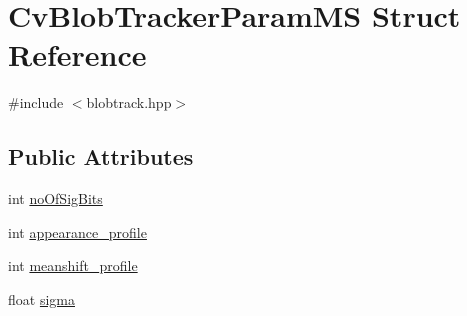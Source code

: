 \hypertarget{structCvBlobTrackerParamMS}{\section{Cv\-Blob\-Tracker\-Param\-M\-S Struct Reference}
\label{structCvBlobTrackerParamMS}
}


{\ttfamily \#include $<$blobtrack.\-hpp$>$}

\subsection*{Public Attributes}
\begin{DoxyCompactItemize}
\item 
int \hyperlink{structCvBlobTrackerParamMS_a7ec209dff925965070ee6b7add5f3f57}{no\-Of\-Sig\-Bits}
\item 
int \hyperlink{structCvBlobTrackerParamMS_ad9ab9608d3ef544322d0b8a974f9a500}{appearance\-\_\-profile}
\item 
int \hyperlink{structCvBlobTrackerParamMS_a0016636f94ba7c0cf4410853b438a19b}{meanshift\-\_\-profile}
\item 
float \hyperlink{structCvBlobTrackerParamMS_a7d7129795980412c56f32eb15a54b0b0}{sigma}
\end{DoxyCompactItemize}


